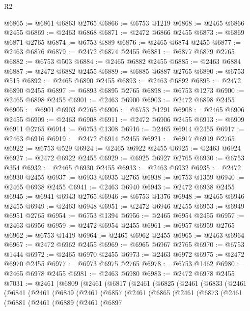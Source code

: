 \begin{lexlean}{R2}
\begin{coremodule}
@6865 := @6861 @6863 @2765
@6866 := @6753 @1219
@6868 := @2465 @6866 @2455
@6869 := @2463 @6868
@6871 := @2472 @6866 @2455
@6873 := @6869 @6871 @2765
@6874 := @6753 @889
@6876 := @2465 @6874 @2455
@6877 := @2463 @6876
@6879 := @2472 @6874 @2455
@6881 := @6877 @6879 @2765
@6882 := @6753 @503
@6884 := @2465 @6882 @2455
@6885 := @2463 @6884
@6887 := @2472 @6882 @2455
@6889 := @6885 @6887 @2765
@6890 := @6753 @515
@6892 := @2465 @6890 @2455
@6893 := @2463 @6892
@6895 := @2472 @6890 @2455
@6897 := @6893 @6895 @2765
@6898 := @6753 @1273
@6900 := @2465 @6898 @2455
@6901 := @2463 @6900
@6903 := @2472 @6898 @2455
@6905 := @6901 @6903 @2765
@6906 := @6753 @1291
@6908 := @2465 @6906 @2455
@6909 := @2463 @6908
@6911 := @2472 @6906 @2455
@6913 := @6909 @6911 @2765
@6914 := @6753 @1308
@6916 := @2465 @6914 @2455
@6917 := @2463 @6916
@6919 := @2472 @6914 @2455
@6921 := @6917 @6919 @2765
@6922 := @6753 @529
@6924 := @2465 @6922 @2455
@6925 := @2463 @6924
@6927 := @2472 @6922 @2455
@6929 := @6925 @6927 @2765
@6930 := @6753 @354
@6932 := @2465 @6930 @2455
@6933 := @2463 @6932
@6935 := @2472 @6930 @2455
@6937 := @6933 @6935 @2765
@6938 := @6753 @1359
@6940 := @2465 @6938 @2455
@6941 := @2463 @6940
@6943 := @2472 @6938 @2455
@6945 := @6941 @6943 @2765
@6946 := @6753 @1376
@6948 := @2465 @6946 @2455
@6949 := @2463 @6948
@6951 := @2472 @6946 @2455
@6953 := @6949 @6951 @2765
@6954 := @6753 @1394
@6956 := @2465 @6954 @2455
@6957 := @2463 @6956
@6959 := @2472 @6954 @2455
@6961 := @6957 @6959 @2765
@6962 := @6753 @1419
@6964 := @2465 @6962 @2455
@6965 := @2463 @6964
@6967 := @2472 @6962 @2455
@6969 := @6965 @6967 @2765
@6970 := @6753 @1444
@6972 := @2465 @6970 @2455
@6973 := @2463 @6972
@6975 := @2472 @6970 @2455
@6977 := @6973 @6975 @2765
@6978 := @6753 @1462
@6980 := @2465 @6978 @2455
@6981 := @2463 @6980
@6983 := @2472 @6978 @2455
@7031 := @2461
    (@6809
      (@2461
        (@6817
          (@2461
            (@6825
              (@2461
                (@6833
                  (@2461
                    (@6841
                      (@2461
                        (@6849
                          (@2461
                            (@6857
                              (@2461
                                (@6865
                                  (@2461
                                    (@6873
                                      (@2461
                                        (@6881
                                          (@2461
                                            (@6889
                                              (@2461
                                                (@6897

\end{coremodule}
\end{lexlean}
